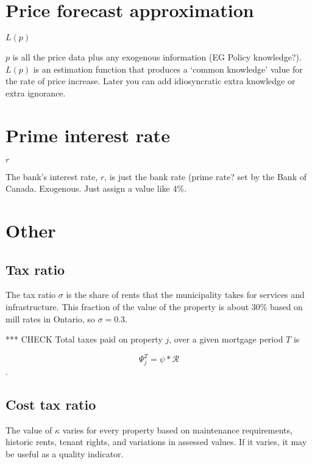 \section{Price forecast approximation} \label{SS:PriceForecast}
$L(p)$

$p$ is all the price data plus any exogenous information (EG Policy knowledge?). $L(p)$ is an estimation function that produces a `common knowledge' value for the rate of price increase. Later you can add idiosyncratic extra knowledge or extra ignorance.



\section{Prime interest rate}\label{SS:BankRate}
$r$

The bank's interest rate, $r$, is just the bank rate (prime rate? set by the Bank of Canada. Exogenous. Just assign  a value like 4\%.



\section{Other}
\subsection{Tax ratio}\label{SS:taxratio} 
The tax ratio $\sigma$ is the share of rents that the municipality takes for services and infrastructure. This fraction of the value of the property is about 30\% based on mill rates in Ontario,  so $\sigma = 0.3$. %

*** CHECK Total taxes paid on  property $j$, over a given mortgage period $T$ is 

\[\Psi_j^T = \psi * \mathcal{R}\].  



\subsection{Cost tax ratio}\label{SS:costratio} 
The value of $\kappa$  varies for every property based on maintenance requirements, historic rents, tenant rights, and variations in assessed values. If it varies, it may be useful as a quality indicator.


